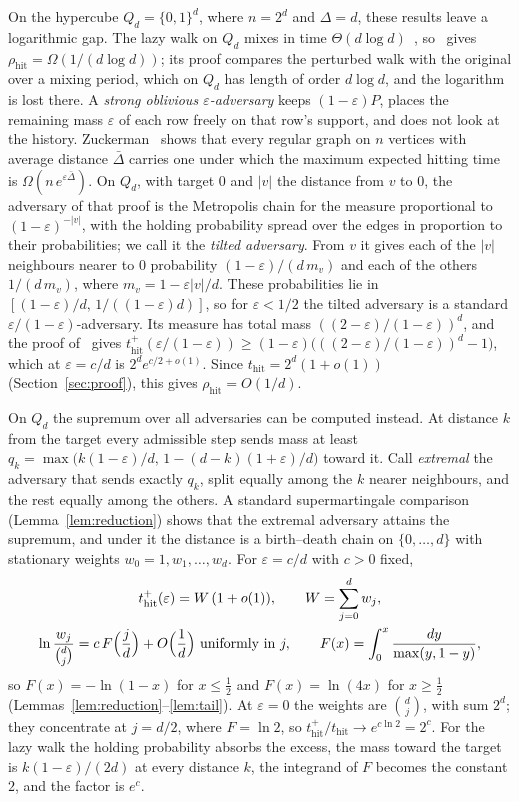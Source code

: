 \documentclass[11pt]{amsart}
\theoremstyle{remark}
\newcommand{\eps}{\varepsilon}
\newcommand{\thit}{t_{\mathrm{hit}}}
\newcommand{\rhit}{\rho_{\mathrm{hit}}}
\begin{document}
On the hypercube $Q_d=\{0,1\}^d$, where $n=2^d$ and $\Delta=d$, these results leave a logarithmic gap. The lazy walk
on $Q_d$ mixes in time $\Theta(d\log d)$~\cite[Section~18.2]{LPW17}, so~\cite[Theorem~1.10]{Zuc26} gives
$\rhit=\Omega(1/(d\log d))$; its proof compares the perturbed walk with the original over a mixing period, which on
$Q_d$ has length of order $d\log d$, and the logarithm is lost there. A \emph{strong oblivious $\eps$-adversary} keeps
$(1-\eps)P$, places the remaining mass $\eps$ of each row freely on that row's support, and does not look at the
history. Zuckerman~\cite[Theorem~4.5]{Zuc26} shows that every regular graph on $n$ vertices with average distance
$\bar\Delta$ carries one under which the maximum expected hitting time is $\Omega(n\,e^{\eps\bar\Delta})$. On $Q_d$,
with target $0$ and $|v|$ the distance from $v$ to $0$, the adversary of that proof is the Metropolis chain for the
measure proportional to $(1-\eps)^{-|v|}$, with the holding probability spread over the edges in proportion to their
probabilities; we call it the \emph{tilted adversary}. From $v$ it gives each of the $|v|$ neighbours nearer to $0$
probability $(1-\eps)/(d\,m_v)$ and each of the others $1/(d\,m_v)$, where $m_v=1-\eps|v|/d$. These probabilities lie
in $[(1-\eps)/d,\,1/((1-\eps)d)]$, so for $\eps<1/2$ the tilted adversary is a standard $\eps/(1-\eps)$-adversary. Its
measure has total mass $((2-\eps)/(1-\eps))^d$, and the proof of~\cite[Theorem~4.5]{Zuc26} gives
$\thit^+(\eps/(1-\eps))\ge(1-\eps)\bigl(((2-\eps)/(1-\eps))^d-1\bigr)$, which at $\eps=c/d$ is $2^de^{c/2+o(1)}$. Since
$\thit=2^d(1+o(1))$ (Section~\ref{sec:proof}), this gives $\rhit=O(1/d)$.

On $Q_d$ the supremum over all adversaries can be computed instead. At distance $k$ from the target every admissible
step sends mass at least $q_k=\max\bigl(k(1-\eps)/d,\,1-(d-k)(1+\eps)/d\bigr)$ toward it. Call \emph{extremal} the
adversary that sends exactly $q_k$, split equally among the $k$ nearer neighbours, and the rest equally among the
others. A standard supermartingale comparison (Lemma~\ref{lem:reduction}) shows that the extremal adversary attains the
supremum, and under it the distance is a birth--death chain on $\{0,\dots,d\}$ with stationary weights
$w_0=1,w_1,\dots,w_d$. For $\eps=c/d$ with $c>0$ fixed,
\begin{gather*}
\thit^+(\eps)=W\,(1+o(1)),\qquad W=\sum_{j=0}^dw_j,\\
\ln\frac{w_j}{\binom dj}=c\,F\Bigl(\frac jd\Bigr)+O\Bigl(\frac1d\Bigr)\ \text{uniformly in }j,\qquad
F(x)=\int_0^x\frac{dy}{\max(y,1-y)},
\end{gather*}
so $F(x)=-\ln(1-x)$ for $x\le\frac12$ and $F(x)=\ln(4x)$ for $x\ge\frac12$
(Lemmas~\ref{lem:reduction}--\ref{lem:tail}). At $\eps=0$ the weights are $\binom dj$, with sum $2^d$; they
concentrate at $j=d/2$, where $F=\ln2$, so $\thit^+/\thit\to e^{c\ln2}=2^c$. For the lazy walk the holding probability
absorbs the excess, the mass toward the target is $k(1-\eps)/(2d)$ at every distance $k$, the integrand of $F$ becomes
the constant $2$, and the factor is $e^c$.
\end{document}
